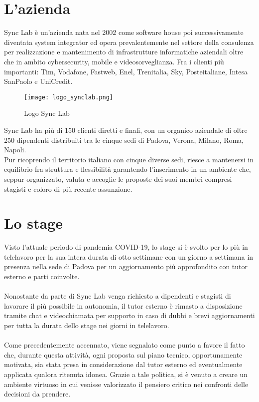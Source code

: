 \section{L'azienda}
Sync Lab è un'azienda nata nel 2002 come software house poi successivamente diventata system integrator ed opera prevalentemente nel settore della consulenza per realizzazione e mantenimento di infrastrutture informatiche aziendali oltre che in ambito cybersecurity, mobile e videosorveglianza. Fra i clienti più importanti: Tim, Vodafone, Fastweb, Enel, Trenitalia, Sky, Posteitaliane, Intesa SanPaolo e UniCredit.

\begin{figure}[h!]
    \centering
    \texttt{[image: logo\_synclab.png]}
    \caption{Logo Sync Lab}
\end{figure}

\noindent Sync Lab ha più di 150 clienti diretti e finali, con un organico aziendale di oltre 250 dipendenti distribuiti tra le cinque sedi di Padova, Verona, Milano, Roma, Napoli.\\
\noindent Pur ricoprendo il territorio italiano con cinque diverse sedi, riesce a mantenersi in equilibrio fra struttura e flessibilità garantendo l'inserimento in un ambiente che, seppur organizzato, valuta e accoglie le proposte dei suoi membri compresi stagisti e coloro di più recente assunzione.

\section{Lo stage}
Visto l'attuale periodo di pandemia COVID-19, lo stage si è svolto per lo più in telelavoro per la sua intera durata di otto settimane con un giorno a settimana in presenza nella sede di Padova per un aggiornamento più approfondito con tutor esterno e parti coinvolte.
\\\\
Nonostante da parte di Sync Lab venga richiesto a dipendenti e stagisti di lavorare il più possibile in autonomia, il tutor esterno è rimasto a disposizione tramite chat e videochiamata per supporto in caso di dubbi e brevi aggiornamenti per tutta la durata dello stage nei giorni in telelavoro.
\\\\
Come precedentemente accennato, viene segnalato come punto a favore il fatto che, durante questa attività, ogni proposta sul piano tecnico, opportunamente motivata, sia stata presa in considerazione dal tutor esterno ed eventualmente applicata qualora ritenuta idonea. Grazie a tale politica, si è venuto a creare un ambiente virtuoso in cui venisse valorizzato il pensiero critico nei confronti delle decisioni da prendere.
